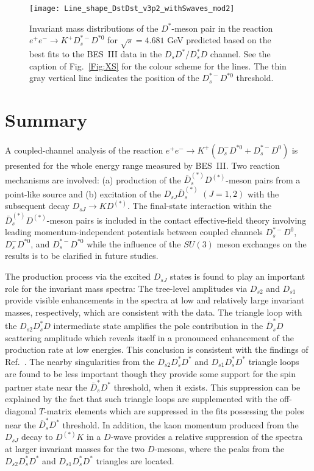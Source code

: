 \documentclass[preprint,12pt,3p]{elsarticle}
\begin{document}
\begin{figure}[t!]
\begin{center}
\texttt{[image: Line\_shape\_DstDst\_v3p2\_withSwaves\_mod2]} 
\caption{Invariant mass distributions of the $D^*$-meson pair 
in the reaction $e^+e^-\to K^+D^{*-}_sD^{*0} $ for $\sqrt{s}=4.681$ GeV predicted based on the best fits to the BES~III data in the $D_sD^*/D^*_sD$ channel. See the caption of Fig.~\ref{Fig:XS} for the colour scheme for the lines. 
The thin gray vertical line indicates the position of the $D^{*-}_sD^{*0} $ threshold. 
\label{Line_shape_DstDst}}
\end{center}
\end{figure}

\section{Summary}

A coupled-channel analysis of the reaction $e^+e^- \to K^+(D_s^-D^{*0}+{D}_s^{*-}D^0)$ is presented for the whole energy range measured by BES~III. Two reaction mechanisms are involved: (a) production of the $\bar{D}_s^{(*)}D^{(*)}$-meson pairs from a point-like source and (b) excitation of the $D_{sJ} \bar{D}_s^{(*)}$ $(J=1,2)$ with the subsequent decay $D_{sJ}\to K D^{(*)}$. The final-state interaction within the $\bar{D}_s^{(*)}D^{(*)}$-meson pairs is included in the contact effective-field theory involving leading momentum-independent potentials between coupled channels ${D}_s^{*-}D^0$, $D_s^-D^{*0}$, and $D_s^{*-}D^{*0}$ while the influence of the $SU(3)$ meson exchanges on the results is to be clarified in future studies. 

The production process via the excited $D_{sJ}$ states is found to play an important role for the invariant mass spectra: The tree-level amplitudes via $D_{s2}$ and $D_{s1}$ provide visible enhancements in the spectra at low and relatively large invariant masses, respectively, which are consistent with the data. The triangle loop with the $D_{s2}D_s^*D$ intermediate state amplifies the pole contribution in the $\bar{D}_s^*D$ scattering amplitude which reveals itself in a pronounced enhancement of the production rate at low energies. This conclusion is consistent with the findings of Ref.~\cite{Yang:2020nrt}. The nearby singularities from the $D_{s2}D_s^*D^*$ and $D_{s1}D_s^*D^*$ triangle loops are found to be less important though 
they provide some support for the spin partner state near the $\bar D_s^*D^*$ threshold, when it exists. This suppression can be explained by the fact that such triangle loops are supplemented with the off-diagonal $T$-matrix elements which are suppressed in the fits possessing the poles near the $\bar D_s^*D^*$ threshold. In addition, the kaon momentum 
produced from the $D_{sJ}$ decay to $D^{(*)}K$ in a $D$-wave provides a relative suppression of the spectra at larger invariant masses for the two $D$-mesons, where the peaks from the $D_{s2}D_s^*D^*$ and $D_{s1}D_s^*D^*$ triangles are located. 
\end{document}
